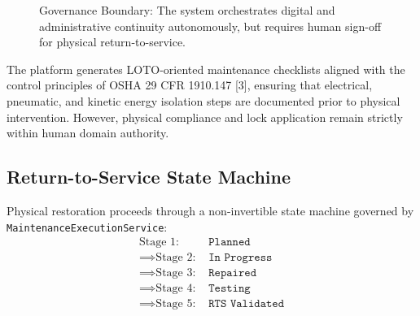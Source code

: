 \documentclass[10pt,twocolumn,a4paper]{article}
\begin{document}
\begin{figure}[H]
\centering
{}
\caption{Governance Boundary: The system orchestrates digital and administrative continuity autonomously, but requires human sign-off for physical return-to-service.\label{fig:governance_boundary}}
\end{figure}

The platform generates LOTO-oriented maintenance checklists aligned with the control principles of OSHA 29 CFR 1910.147 [3], ensuring that electrical, pneumatic, and kinetic energy isolation steps are documented prior to physical intervention. However, physical compliance and lock application remain strictly within human domain authority.

\subsection{Return-to-Service State Machine}
Physical restoration proceeds through a non-invertible state machine governed by \texttt{MaintenanceExecutionService}:
\begin{align*}
    \text{Stage 1: } & \texttt{Planned} \\
    \implies \text{Stage 2: } & \texttt{In Progress} \\
    \implies \text{Stage 3: } & \texttt{Repaired} \\
    \implies \text{Stage 4: } & \texttt{Testing} \\
    \implies \text{Stage 5: } & \texttt{RTS Validated}
\end{align*}
\end{document}
